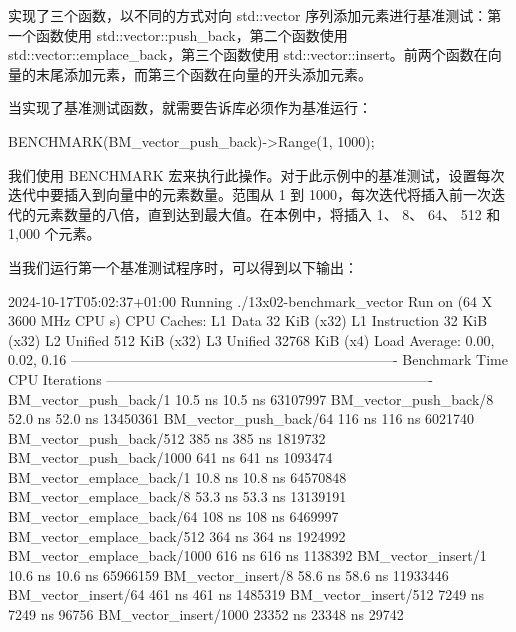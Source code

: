 实现了三个函数，以不同的方式对向 std::vector 序列添加元素进行基准测试：第一个函数使用 std::vector::push\_back，第二个函数使用 std::vector::emplace\_back，第三个函数使用 std::vector::insert。前两个函数在向量的末尾添加元素，而第三个函数在向量的开头添加元素。

当实现了基准测试函数，就需要告诉库必须作为基准运行：

\begin{cpp}
BENCHMARK(BM_vector_push_back)->Range(1, 1000);
\end{cpp}

我们使用 BENCHMARK 宏来执行此操作。对于此示例中的基准测试，设置每次迭代中要插入到向量中的元素数量。范围从 1 到 1000，每次迭代将插入前一次迭代的元素数量的八倍，直到达到最大值。在本例中，将插入 1、 8、 64、 512 和 1,000 个元素。

当我们运行第一个基准测试程序时，可以得到以下输出：

\begin{shell}
2024-10-17T05:02:37+01:00
Running ./13x02-benchmark_vector
Run on (64 X 3600 MHz CPU s)
CPU Caches:
  L1 Data 32 KiB (x32)
  L1 Instruction 32 KiB (x32)
  L2 Unified 512 KiB (x32)
  L3 Unified 32768 KiB (x4)
Load Average: 0.00, 0.02, 0.16
----------------------------------------------------------------------
Benchmark                         Time               CPU    Iterations
----------------------------------------------------------------------
BM_vector_push_back/1          10.5 ns           10.5 ns      63107997
BM_vector_push_back/8          52.0 ns           52.0 ns      13450361
BM_vector_push_back/64          116 ns            116 ns       6021740
BM_vector_push_back/512         385 ns            385 ns       1819732
BM_vector_push_back/1000        641 ns            641 ns       1093474
BM_vector_emplace_back/1       10.8 ns           10.8 ns      64570848
BM_vector_emplace_back/8       53.3 ns           53.3 ns      13139191
BM_vector_emplace_back/64       108 ns            108 ns       6469997
BM_vector_emplace_back/512      364 ns            364 ns       1924992
BM_vector_emplace_back/1000     616 ns            616 ns       1138392
BM_vector_insert/1             10.6 ns           10.6 ns      65966159
BM_vector_insert/8             58.6 ns           58.6 ns      11933446
BM_vector_insert/64             461 ns            461 ns       1485319
BM_vector_insert/512           7249 ns           7249 ns         96756
BM_vector_insert/1000         23352 ns          23348 ns         29742
\end{shell}

